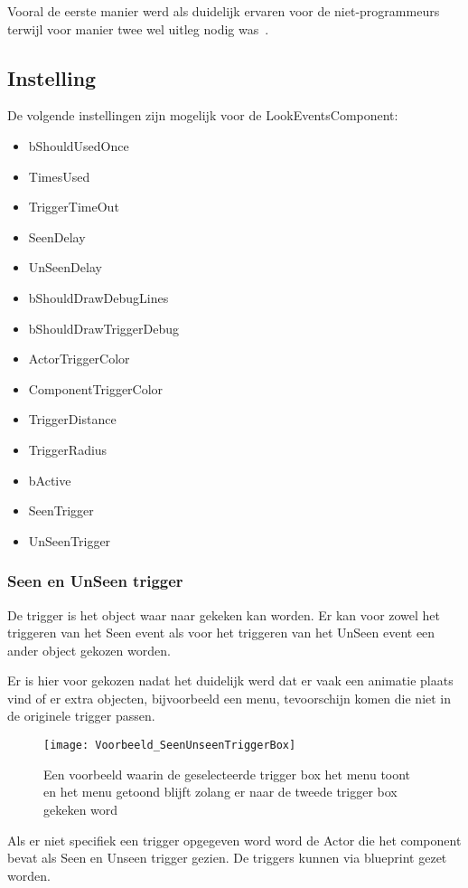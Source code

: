 Vooral de eerste manier werd als duidelijk ervaren voor de niet-programmeurs terwijl voor manier twee wel uitleg nodig was~.

\subsection{Instelling}
De volgende instellingen zijn mogelijk voor de LookEventsComponent:

\begin{itemize}
	\item bShouldUsedOnce
	\item TimesUsed
	\item TriggerTimeOut
	\item SeenDelay
	\item UnSeenDelay
	\item bShouldDrawDebugLines
	\item bShouldDrawTriggerDebug
	\item ActorTriggerColor
	\item ComponentTriggerColor
	\item TriggerDistance
	\item TriggerRadius
	\item bActive
	\item SeenTrigger
	\item UnSeenTrigger
\end{itemize}

\subsubsection{Seen en UnSeen trigger}
De trigger is het object waar naar gekeken kan worden. Er kan voor zowel het triggeren van het Seen event als voor het triggeren van het UnSeen event een ander object gekozen worden.

Er is hier voor gekozen nadat het duidelijk werd dat er vaak een animatie plaats vind of er extra objecten, bijvoorbeeld een menu, tevoorschijn komen die niet in de originele trigger passen.

\begin{figure}[!ht]
  \centering
    \texttt{[image: Voorbeeld\_SeenUnseenTriggerBox]}
    \caption{Een voorbeeld waarin de geselecteerde trigger box het menu toont en het menu getoond blijft zolang er naar de tweede trigger box gekeken word}
\end{figure}

Als er niet specifiek een trigger opgegeven word word de Actor die het component bevat als Seen en Unseen trigger gezien. De triggers kunnen via blueprint gezet worden.

